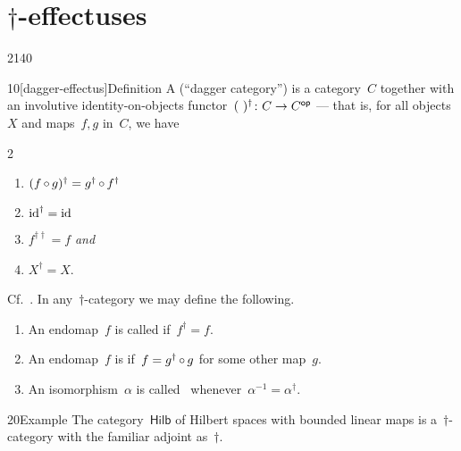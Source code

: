 \section{\texorpdfstring{$\dagger$-effectuses}{%
                    dagger-effectuses}}
\begin{parsec}{2140}%
\begin{point}{10}[dagger-effectus]{Definition}%
A  (``dagger category'')
is a category~$C$ together with an involutive identity-on-objects
    functor~$(\ )^\dagger \colon C \to {C}{^{\mathsf{op}}}$
    ---
    that is, for all objects~$X$ and maps~$f,g$ in~$C$, we have
\begin{multicols}{2}
\begin{enumerate}
    \item $(f \mathop{\circ} g)^\dagger = g^\dagger \mathop{\circ} f^\dagger$
    \item $\operatorname{id}^\dagger = \operatorname{id}$
    \item $f^{\dagger\dagger} = f$ \emph{and}
    \item $X^\dagger = X$.
\end{enumerate}
\end{multicols}
\noindent
Cf.~\cite{burgin1970categories,selinger2007dagger,heunenphd}.
In any~$\dagger$-category we may define the following.
\begin{enumerate}
\item
    An endomap~$f$ is called 
    if~$f^\dagger = f$.
\item
    An endomap~$f$ is 
    if~$f = g^\dagger \mathop{\circ} g$ for some other map~$g$.
\item
    An isomorphism~$\alpha$ is called~
        whenever~$\alpha^{-1} = \alpha^\dagger$.
\end{enumerate}
\end{point}
\begin{point}{20}{Example}%
The category~$\mathsf{Hilb}$
    of Hilbert spaces with bounded linear maps
    is a~$\dagger$-category
    with the familiar adjoint as~$\dagger$.
\end{point}
\end{parsec}
